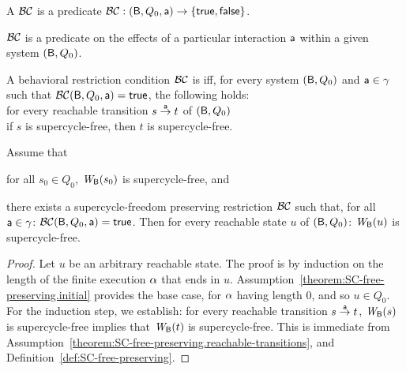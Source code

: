 

\begin{definition}
A  $\BC$ is a predicate
$\BC: (\B, Q_0, \act) \to \set{\ttt, \fff}$.
\end{definition}
%
$\BC$ is a predicate on the effects of a particular interaction $\act$ within a given system
$(\B, Q_0)$.

\begin{definition} \label{def:SC-free-preserving}
A behavioral restriction condition $\BC$ is  iff, for every system 
$(\B, Q_0)$ and $\act \in \gamma$ such that $\BC(\B, Q_0, \act) = \ttt$, the following holds:\\%
%
\ind \ind for every reachable transition $s \goesto[\act] t$ of $(\B, Q_0)$\\
\ind \ind \ind if $s$ is supercycle-free, then $t$ is supercycle-free.
\end{definition}


\begin{theorem}
\label{theorem:SC-free-preserving.deadlock-free}
\label{thm:SC-free-preserving.deadlock-free}
Assume that
\bn
\item \label{theorem:SC-free-preserving.initial}
      for all $s_0 \in Q_0$, $\wfg{\B}{s_0}$ is supercycle-free, and
\item \label{theorem:SC-free-preserving.reachable-transitions}
   there exists a supercycle-freedom preserving restriction $\BC$ such that,
   for all $\act \in \gamma$: $\BC(\B, Q_0, \act) = \ttt$. 
\en
Then for every reachable state $u$ of $(\B, Q_0)$:  $\wfg{\B}{u}$ is supercycle-free.
\end{theorem}
%
\begin{proof} Let $u$ be an arbitrary reachable state. The proof is by induction on the length of the finite
execution $\al$ that ends in $u$.  Assumption~\ref{theorem:SC-free-preserving.initial} provides the
base case, for $\al$ having length 0, and so $u \in Q_0$.  For the induction step, we establish: for
every reachable transition $s \la{\act} t$, $\wfg{\B}{s}$ is supercycle-free implies that
$\wfg{\B}{t}$ is supercycle-free. This is immediate from
Assumption~\ref{theorem:SC-free-preserving.reachable-transitions}, and
Definition~\ref{def:SC-free-preserving}. 
\end{proof}

